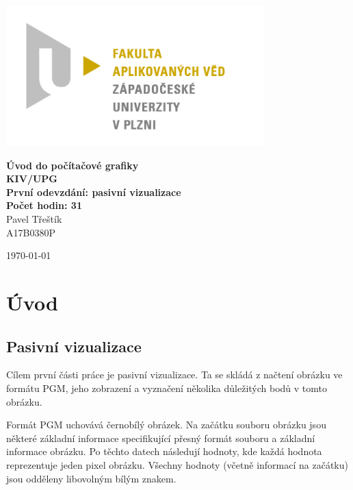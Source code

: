 \documentclass[12pt]{report}
\begin{document}
%

\begin{titlepage}
\centerline{\includegraphics[width=10cm]{img/logo.jpg}}
\begin{center}
\vspace{30px}
{\huge
\textbf{Úvod do počítačové grafiky}\\
\textbf{KIV/UPG}\\
\vspace{1cm}
}
{\large
\textbf{První odevzdání: pasivní vizualizace}\\
\textbf{Počet hodin: 31}\\
\vspace{1cm}
}
\vspace{1cm}
{\large
Pavel Třeštík\\
}
{\normalsize
A17B0380P
}
\end{center}
\vspace{\fill}
\hfill
\begin{minipage}[t]{7cm}
\flushright
\today
\end{minipage}
\end{titlepage}
%
%
%
\tableofcontents
%
%
%
\chapter{Úvod}
\section{Pasivní vizualizace}
Cílem první části práce je pasivní vizualizace. Ta se skládá z načtení obrázku ve formátu PGM,
jeho zobrazení a vyznačení několika důležitých bodů v tomto obrázku. 

Formát PGM uchovává černobílý obrázek. Na začátku souboru obrázku jsou některé základní informace
specifikující přesný formát souboru a základní informace obrázku. Po těchto datech následují hodnoty,
kde každá hodnota reprezentuje jeden pixel obrázku. Všechny hodnoty (včetně informací na začátku)
jsou odděleny libovolným bílým znakem.
\end{document}
